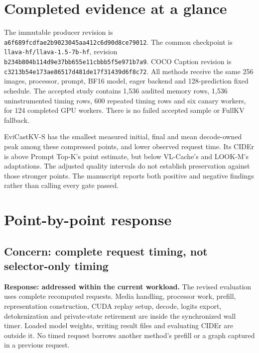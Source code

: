 \documentclass[11pt]{article}
\begin{document}
\section{Completed evidence at a glance}
The immutable producer revision is
\nolinkurl{a6f689fcdfae2b9023045aa412c6d90d8ce79012}.
The common checkpoint is \texttt{llava-hf/llava-1.5-7b-hf}, revision
\nolinkurl{b234b804b114d9e37bb655e11cbbb5f5e971b7a9}.
COCO Caption revision is
\nolinkurl{c3213b54e173ae86517d481de17f31439d6f8c72}.
All methods receive the same 256 images, processor, prompt, BF16 model,
eager backend and 128-prediction fixed schedule. The accepted study
contains 1,536 audited memory rows, 1,536 uninstrumented timing rows,
600 repeated timing rows and six canary workers, for 124 completed GPU
workers. There is no failed accepted sample or FullKV fallback.

\begin{table}[ht]
\centering\small\setlength{\tabcolsep}{4pt}
\resizebox{\textwidth}{!}{}
\caption{Measured operating points. Memory is MiB; latency is seconds.
R+A means a local reimplementation plus precision/storage adaptation;
A means an adaptation. The measured byte budgets differ.}
\end{table}

EviCastKV-S has the smallest measured initial, final and mean decode-owned
peak among these compressed points, and lower observed request time.
Its CIDEr is above Prompt Top-K's point estimate, but below VL-Cache's
and LOOK-M's adaptations. The adjusted quality intervals do not establish
preservation against those stronger points. The manuscript reports both
positive and negative findings rather than calling every gate passed.

\section{Point-by-point response}
\subsection{Concern: complete request timing, not selector-only timing}
\textbf{Response: addressed within the current workload.}
The revised evaluation uses complete recomputed requests. Media handling,
processor work, prefill, representation construction, CUDA replay setup,
decode, logits export, detokenization and private-state retirement are
inside the synchronized wall timer. Loaded model weights, writing result
files and evaluating CIDEr are outside it. No timed request borrows
another method's prefill or a graph captured in a previous request.
\end{document}
